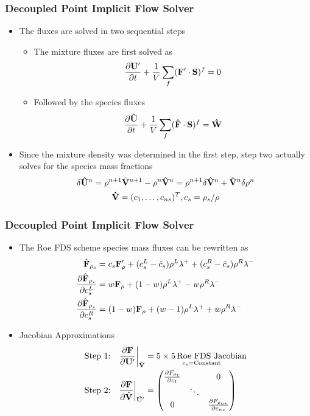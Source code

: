 \documentclass{beamer}
\begin{document}
\begin{frame}
  \frametitle{Decoupled Point Implicit Flow Solver}
  \begin{itemize}
    \item The fluxes are solved in two sequential steps
      \begin{itemize}
        \item  The mixture fluxes are first solved as
        \[
          \frac{\partial \mathbf U'}{\partial t} +
          \frac{1}{V}\sum\limits_{f}(\mathbf F'\cdot\mathbf S)^f = 0
        \]
      \item Followed by the species fluxes
      \[
        \frac{\partial \mathbf{\hat{U}}}{\partial t} +
        \frac{1}{V}\sum\limits_{f}(\mathbf{\hat{F}}\cdot \mathbf S)^f =
        \mathbf{\hat{W}}
      \]
    \end{itemize}
    \item Since the mixture density was determined in the first step, step two
      actually solves for the species mass fractions
      \begin{gather*}
        \delta \mathbf{\hat{U}}^n 
        = \rho^{n+1} \hat{\mathbf V}^{n+1}-\rho^n\mathbf{\hat{V}}^n = \rho^{n+1} \delta
        \mathbf{\hat{V}}^n + \mathbf{\hat{V}}^n \delta \rho^n \\
        \mathbf{\hat{V}}=(c_1,\hdots,c_{ns})^T, c_s=\rho_s/\rho
      \end{gather*}
  \end{itemize}
\end{frame}
\begin{frame}
  \frametitle{Decoupled Point Implicit Flow Solver}
  \begin{itemize}
    \item The Roe FDS scheme species mass fluxes can be rewritten as
      \begin{align*}
  	\hat{\mathbf F}_{\rho_s} &= c_s \mathbf F'_\rho+(c_s^L-\tilde{c}_s)\rho^L\lambda^+
  	+ (c_s^R-\tilde{c}_s)\rho^R\lambda^- \\
	\frac{\partial \hat{\mathbf F}_{\rho_s}}{\partial c_s^L} 
	&= w\mathbf F_\rho+(1-w)\rho^L\lambda^+ - w\rho^R\lambda^- \\
	\frac{\partial \hat{\mathbf F}_{\rho_s}}{\partial c_s^R} 
	&= (1-w)\mathbf F_\rho+(w-1)\rho^L\lambda^+ + w\rho^R\lambda^- \label{d_last}
      \end{align*}
    \item Jacobian Approximations
      \begin{align*}
	\text{Step 1:}\quad &
	\frac{\partial \mathbf F}{\partial \mathbf U'}\bigg|_{\mathbf{\hat{V}}} =
	\underset{c_s = \text{Constant}}{5 \times 5\,\text{Roe FDS Jacobian}} \\
	\text{Step 2:}\quad & 
	\frac{\partial \mathbf F}{\partial \hat{\mathbf V}}\bigg|_{\mathbf{\hat{U'}}} = 
        \begin{pmatrix} 
          \frac{\partial F_{\rho_1}}{\partial c_1} & & 0
          \\ & \ddots &  \\ 0 & & \frac{\partial F_{\rho_{ns}}}{\partial c_{ns}}
        \end{pmatrix} 
      \end{align*}
  \end{itemize}
\end{frame}
\end{document}
